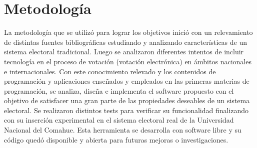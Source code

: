 \section{Metodología}
La metodología que se utilizó para lograr los objetivos inició con un relevamiento de distintas fuentes bibliográficas estudiando y analizando características de un sistema electoral tradicional.
Luego se analizaron diferentes intentos de incluir tecnología en el proceso de votación (votación electrónica) en ámbitos nacionales e internacionales. Con este conocimiento relevado y los contenidos de programación y aplicaciones enseñados y empleados en las primeras materias de programación, se analiza, diseña e implementa el software propuesto con el objetivo de satisfacer una gran parte de las propiedades deseables de un sistema electoral. Se realizaron distintos tests para verificar su funcionalidad finalizando con su inserción experimental en el sistema electoral real de la Universidad Nacional del Comahue. Esta herramienta se desarrolla con software libre y su código quedó disponible y abierta para futuras mejoras o investigaciones.

